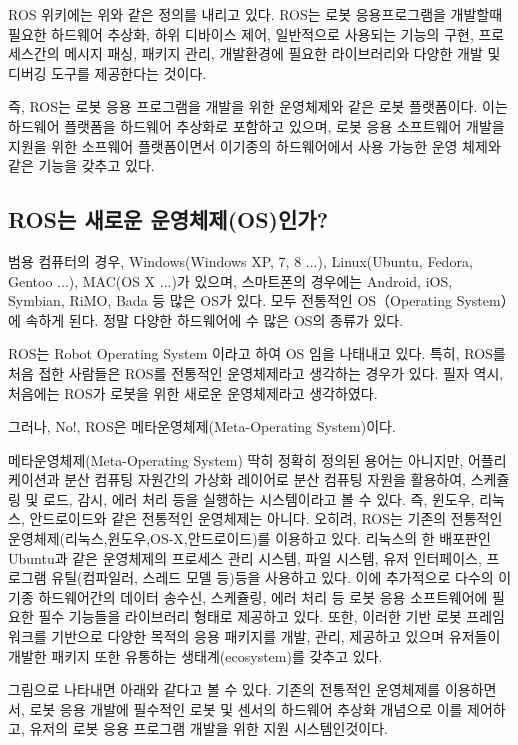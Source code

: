 ROS 위키에는 위와 같은 정의를 내리고 있다. ROS는 로봇 응용프로그램을 개발할때 필요한 하드웨어 추상화, 하위 디바이스 제어, 일반적으로 사용되는 기능의 구현, 프로세스간의 메시지 패싱, 패키지 관리, 개발환경에 필요한 라이브러리와 다양한 개발 및 디버깅 도구를 제공한다는 것이다. 

즉, ROS는 로봇 응용 프로그램을 개발을 위한 운영체제와 같은 로봇 플랫폼이다.
이는 하드웨어 플랫폼을 하드웨어 추상화로 포함하고 있으며, 로봇 응용 소프트웨어 개발을 지원을 위한 소프웨어 플랫폼이면서 이기종의 하드웨어에서 사용 가능한 운영 체제와 같은 기능을 갖추고 있다.

\subsection{ROS는 새로운 운영체제(OS)인가?}

범용 컴퓨터의 경우, Windows(Windows XP, 7, 8 ...), Linux(Ubuntu, Fedora, Gentoo ...), MAC(OS X ...)가 있으며, 스마트폰의 경우에는 Android, iOS, Symbian, RiMO, Bada 등 많은 OS가 있다.
모두 전통적인 OS（Operating System）에 속하게 된다.
정말 다양한 하드웨어에 수 많은 OS의 종류가 있다. 

ROS는 Robot Operating System 이라고 하여 OS 임을 나태내고 있다.
특히, ROS를 처음 접한 사람들은 ROS를 전통적인 운영체제라고 생각하는 경우가 있다.
필자 역시, 처음에는 ROS가 로봇을 위한 새로운 운영체제라고 생각하였다. 

그러나, No!, ROS은 메타운영체제(Meta-Operating System)이다.

메타운영체제(Meta-Operating System) 딱히 정확히 정의된 용어는 아니지만, 어플리케이션과 분산 컴퓨팅 자원간의 가상화 레이어로 분산 컴퓨팅 자원을 활용하여, 스케쥴링 및 로드, 감시, 에러 처리 등을 실행하는 시스템이라고 볼 수 있다.
즉, 윈도우, 리눅스, 안드로이드와 같은 전통적인 운영체제는 아니다.
오히려, ROS는 기존의 전통적인 운영체제(리눅스,윈도우,OS-X,안드로이드)를 이용하고 있다.
리눅스의 한 배포판인 Ubuntu과 같은 운영체제의 프로세스 관리 시스템, 파일 시스템, 유저 인터페이스, 프로그램 유틸(컴파일러, 스레드 모델 등)등을 사용하고 있다.
이에 추가적으로 다수의 이기종 하드웨어간의 데이터 송수신, 스케쥴링, 에러 처리 등 로봇 응용 소프트웨어에 필요한 필수 기능들을 라이브러리 형태로 제공하고 있다.
또한, 이러한 기반 로봇 프레임워크를 기반으로 다양한 목적의 응용 패키지를 개발, 관리, 제공하고 있으며 유저들이 개발한 패키지 또한 유통하는 생태계(ecosystem)를 갖추고 있다.

그림으로 나타내면 아래와 같다고 볼 수 있다. 기존의 전통적인 운영체제를 이용하면서, 로봇 응용 개발에 필수적인 로봇 및 센서의 하드웨어 추상화 개념으로 이를 제어하고, 유저의 로봇 응용 프로그램 개발을 위한 지원 시스템인것이다.


